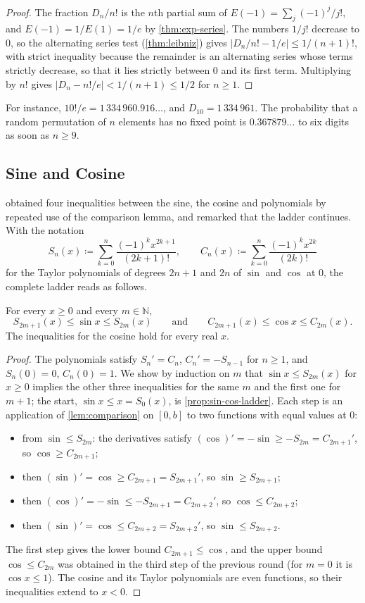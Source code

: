 \begin{proof}
The fraction $D_n/n!$ is the $n$th partial sum of $E(-1)=\sum_j(-1)^j/j!$, and $E(-1)=1/E(1)=1/e$ by \cref{thm:exp-series}. The numbers $1/j!$ decrease to $0$, so the alternating series test (\cref{thm:leibniz}) gives $|D_n/n!-1/e|\le1/(n+1)!$, with strict inequality because the remainder is an alternating series whose terms strictly decrease, so that it lies strictly between $0$ and its first term. Multiplying by $n!$ gives $|D_n-n!/e|<1/(n+1)\le1/2$ for $n\ge1$.
\end{proof}

For instance, $10!/e=1\,334\,960.916\ldots$, and $D_{10}=1\,334\,961$. The probability that a random permutation of $n$ elements has no fixed point is $0.367879\ldots$ to six digits as soon as $n\ge9$.

\subsection{Sine and Cosine}

 obtained four inequalities between the sine, the cosine and polynomials by repeated use of the comparison lemma, and remarked that the ladder continues. With the notation
\[
S_n(x)\coloneqq\sum_{k=0}^n\frac{(-1)^kx^{2k+1}}{(2k+1)!},\qquad C_n(x)\coloneqq\sum_{k=0}^n\frac{(-1)^kx^{2k}}{(2k)!}
\]
for the Taylor polynomials of degrees $2n+1$ and $2n$ of $\sin$ and $\cos$ at $0$, the complete ladder reads as follows.

\begin{proposition}
\label{prop:sin-cos-series}
For every $x\ge0$ and every $m\in\mathbb N$,
\[
S_{2m+1}(x)\le\sin x\le S_{2m}(x)\qquad\text{and}\qquad C_{2m+1}(x)\le\cos x\le C_{2m}(x).
\]
The inequalities for the cosine hold for every real $x$.
\end{proposition}

\begin{proof}
The polynomials satisfy $S_n'=C_n$, $C_n'=-S_{n-1}$ for $n\ge1$, and $S_n(0)=0$, $C_n(0)=1$. We show by induction on $m$ that $\sin x\le S_{2m}(x)$ for $x\ge0$ implies the other three inequalities for the same $m$ and the first one for $m+1$; the start, $\sin x\le x=S_0(x)$, is \cref{prop:sin-cos-ladder}. Each step is an application of \cref{lem:comparison} on $[0,b]$ to two functions with equal values at $0$:
\begin{itemize}
\item from $\sin\le S_{2m}$: the derivatives satisfy $(\cos)'=-\sin\ge-S_{2m}=C_{2m+1}'$, so $\cos\ge C_{2m+1}$;
\item then $(\sin)'=\cos\ge C_{2m+1}=S_{2m+1}'$, so $\sin\ge S_{2m+1}$;
\item then $(\cos)'=-\sin\le-S_{2m+1}=C_{2m+2}'$, so $\cos\le C_{2m+2}$;
\item then $(\sin)'=\cos\le C_{2m+2}=S_{2m+2}'$, so $\sin\le S_{2m+2}$.
\end{itemize}
The first step gives the lower bound $C_{2m+1}\le\cos$, and the upper bound $\cos\le C_{2m}$ was obtained in the third step of the previous round (for $m=0$ it is $\cos x\le1$). The cosine and its Taylor polynomials are even functions, so their inequalities extend to $x<0$.
\end{proof}

